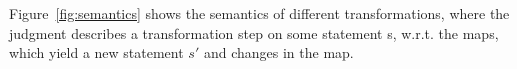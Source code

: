 Figure~\ref{fig:semantics} shows the semantics of different transformations, where the judgment describes a
transformation step on some statement s, w.r.t. the maps, which yield a new statement $s'$ and
changes in the map.\\
%
%
